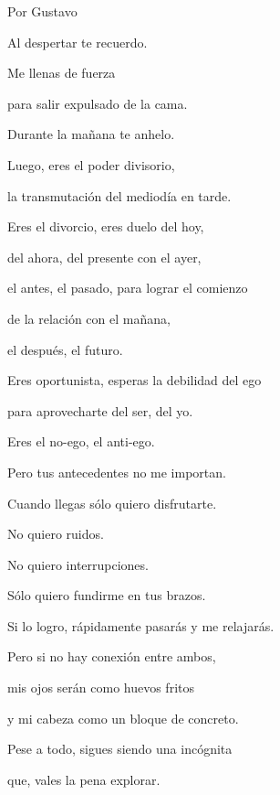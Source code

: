 \documentclass[11pt,twoside,openright,a5paper]{book}
\begin{document}
\begin{flushright}Por Gustavo\end{flushright}


\begin{center}
Al despertar te recuerdo.

Me llenas de fuerza

para salir expulsado de la cama.

Durante la mañana te anhelo.

Luego, eres el poder divisorio, 

la transmutación del mediodía en tarde.

Eres el divorcio, eres duelo del hoy, 

del ahora, del presente con el ayer, 

el antes, el pasado, para lograr el comienzo 

de la relación con el mañana, 

el después, el futuro.

Eres oportunista, esperas la debilidad del ego

para aprovecharte del ser, del yo.

Eres el no-ego, el anti-ego.

Pero tus antecedentes no me importan.

Cuando llegas sólo quiero disfrutarte.

No quiero ruidos.

No quiero interrupciones.

Sólo quiero fundirme en tus brazos.

Si lo logro, rápidamente pasarás y me relajarás.

Pero si no hay conexión entre ambos,

mis ojos serán como huevos fritos 

y mi cabeza como un bloque de concreto.

Pese a todo, sigues siendo una incógnita

que, vales la pena explorar.
\end{center}
\end{document}
